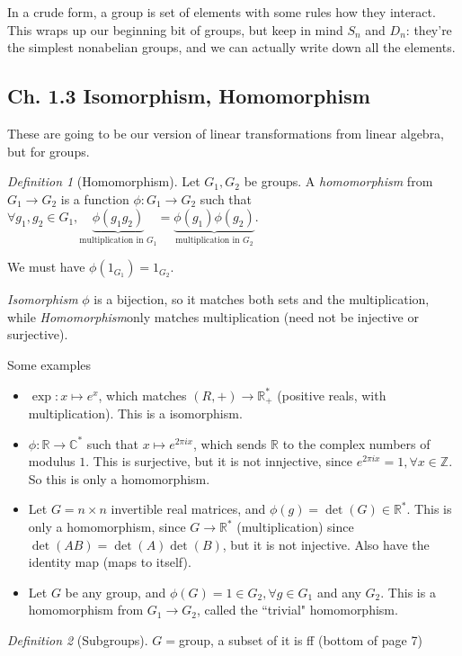 \documentclass{article}
\theoremstyle{plain}
\theoremstyle{remark}
\newtheorem{definition}{Definition}
\newcommand{\Z}{{\mathbb Z}}
\newcommand{\R}{{\mathbb R}}
\newcommand{\C}{{\mathbb C}}
\begin{document}
In a crude form, a group is set of elements with some rules how they interact.
This wraps up our beginning bit of groups,
but keep in mind $S_n$ and $D_n$:
they're the simplest nonabelian groups,
and we can actually write down all the elements.

\subsection*{Ch. 1.3 Isomorphism, Homomorphism}
These are going to be our version of linear transformations
from linear algebra, but for groups.
\begin{definition}[Homomorphism]
Let $G_1, G_2$ be groups.
A {\it homomorphism} from $G_1 \to G_2$
is a function $\phi \colon G_1 \to G_2$ such that
$\forall g_1,g_2 \in G_1,
\underbrace{\phi(g_1 g_2)}_{\text{multiplication in }G_1}
= \underbrace{\phi(g_1)\phi(g_2)}_{\text{multiplication in }G_2}$.
\end{definition}
We must have $\phi(1_{G_1}) = 1_{G_2}$.

{\it Isomorphism} $\phi$ is a bijection,
so it matches both sets and the multiplication,
while {\it Homomorphism}only matches multiplication
(need not be injective or surjective).

Some examples
\begin{itemize}
\item $\exp \colon x \mapsto e^x$,
which matches $(R, +) \to \R^*_+$ (positive reals, with multiplication).
This is a isomorphism.
\item $\phi \colon \R \to \C^*$ such that $x \mapsto e^{2\pi ix}$,
which sends $\R$ to the complex numbers of modulus $1$.
This is surjective, but it is not innjective, since $e^{2\pi i x} = 1, \forall x \in \Z$.
So this is only a homomorphism.
\item Let $G = n\times n$ invertible real matrices,
and $\phi(g) = \det(G) \in \R^*$.
This is only a homomorphism,
since $G \to \R^*$ (multiplication) since $\det(AB) = \det(A)\det(B)$,
but it is not injective.
Also have the identity map (maps to itself).
\item Let $G$ be any group, and $\phi(G) = 1\in G_2, \forall g\in G_1$ and any $G_2$.
This is a homomorphism from $G_1 \to G_2$,
called the ``trivial" homomorphism.
\end{itemize}

\begin{definition}[Subgroups]
$G = $group, a subset of it is ff (bottom of page 7)
\end{definition}
\end{document}
